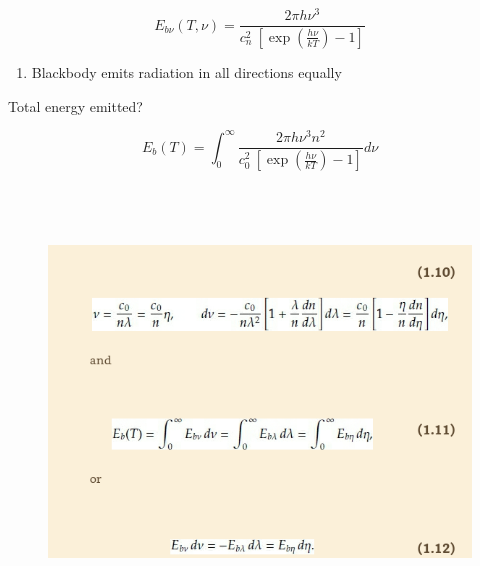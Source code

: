 \documentclass[12pt]{article}
\renewcommand{\_}{\kern-1.5pt\textunderscore\kern-1.5pt}
\begin{document}
\begin{itemize}
 \[ E_{b \nu } \left( T, \nu  \right) =\frac{2 \pi h \nu ^{3}}{c_{n}^{2}~ \left[ \exp  \left( \frac{h \nu }{kT} \right) -1 \right] } \] \par

\begin{enumerate}
	\item Blackbody emits radiation in all directions equally
\end{enumerate}\par

Total energy emitted?\par

 \[ E_{b} \left( T \right) =  \int _{0}^{\infty}\frac{2 \pi h \nu ^{3}n^{2}}{c_{0}^{2}~ \left[ \exp  \left( \frac{h \nu }{kT} \right) -1 \right] } d \nu  \] \par




\begin{figure}[H]
	\begin{Center}
		\includegraphics[width=6.1in,height=4.51in]{./media/image9.png}
	\end{Center}
\end{figure}



\par


\end{itemize}
\end{document}
